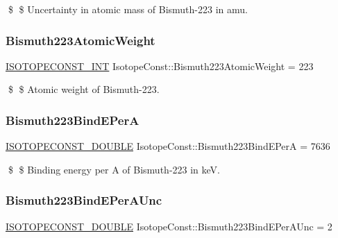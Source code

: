 \$ \$ Uncertainty in atomic mass of Bismuth-\/223 in amu. \mbox{\label{group___isotope_const-_bismuth-_bi223_ga616c0a93b0b58d7a33a00c932861fe5c}} 
\subsubsection{\texorpdfstring{Bismuth223\+Atomic\+Weight}{Bismuth223AtomicWeight}}
{\footnotesize\ttfamily \mbox{\hyperlink{group___isotope_const-_macros_ga5f18360b3e99483a35c32d789e62621c}{I\+S\+O\+T\+O\+P\+E\+C\+O\+N\+S\+T\+\_\+\+I\+NT}} Isotope\+Const\+::\+Bismuth223\+Atomic\+Weight = 223}

\$ \$ Atomic weight of Bismuth-\/223. \mbox{\label{group___isotope_const-_bismuth-_bi223_gad3234bf77ffab1596832440a8981dcae}} 
\subsubsection{\texorpdfstring{Bismuth223\+Bind\+E\+PerA}{Bismuth223BindEPerA}}
{\footnotesize\ttfamily \mbox{\hyperlink{group___isotope_const-_macros_ga8f45a7272ce02c0b4c65c44636ed719a}{I\+S\+O\+T\+O\+P\+E\+C\+O\+N\+S\+T\+\_\+\+D\+O\+U\+B\+LE}} Isotope\+Const\+::\+Bismuth223\+Bind\+E\+PerA = 7636}

\$ \$ Binding energy per A of Bismuth-\/223 in keV. \mbox{\label{group___isotope_const-_bismuth-_bi223_gae9359f88ae0cb82728da398623203345}} 
\subsubsection{\texorpdfstring{Bismuth223\+Bind\+E\+Per\+A\+Unc}{Bismuth223BindEPerAUnc}}
{\footnotesize\ttfamily \mbox{\hyperlink{group___isotope_const-_macros_ga8f45a7272ce02c0b4c65c44636ed719a}{I\+S\+O\+T\+O\+P\+E\+C\+O\+N\+S\+T\+\_\+\+D\+O\+U\+B\+LE}} Isotope\+Const\+::\+Bismuth223\+Bind\+E\+Per\+A\+Unc = 2}

